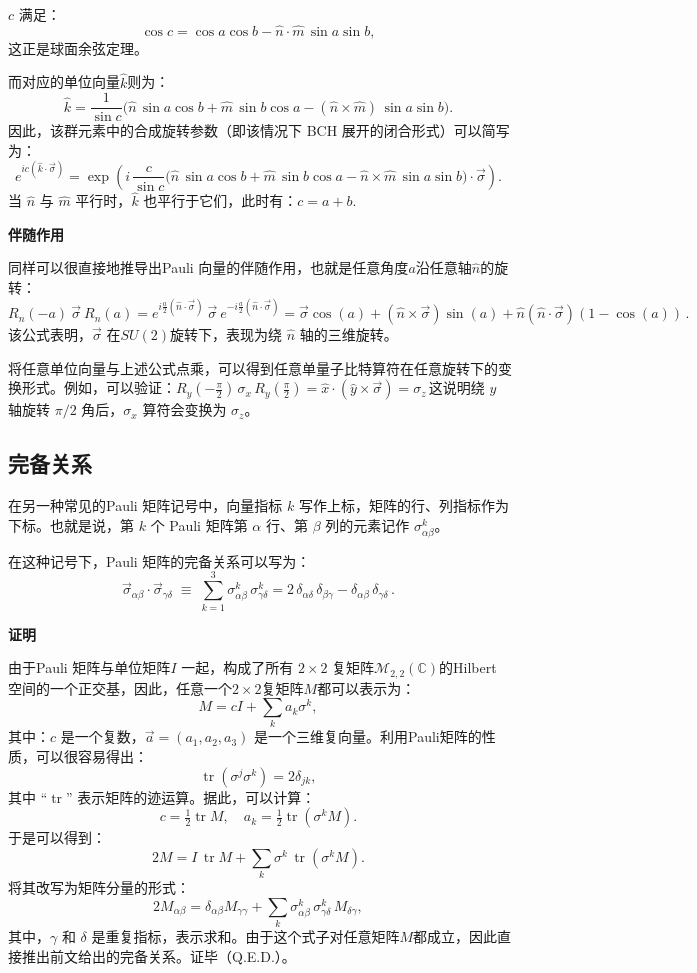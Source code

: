 $c$ 满足：
  $$
  \cos c = \cos a \cos b - \hat{n} \cdot \hat{m} \, \sin a \sin b,~
  $$
这正是球面余弦定理。

而对应的单位向量$\hat{k}$则为：
  $$
  \hat{k} = \frac{1}{\sin c} 
  \big(
  \hat{n}\,\sin a \cos b 
  + \hat{m}\,\sin b \cos a 
  - (\hat{n} \times \hat{m}) \, \sin a \sin b
  \big) .~
  $$
因此，该群元素中的合成旋转参数（即该情况下 BCH 展开的闭合形式）可以简写为：
$$
e^{ic(\hat{k}\cdot\vec{\sigma})} 
= 
\exp \!\left(
  i \, \frac{c}{\sin c} 
  \big(
  \hat{n}\,\sin a \cos b 
  + \hat{m}\,\sin b \cos a 
  - \hat{n}\times\hat{m} \, \sin a \sin b
  \big) 
  \cdot \vec{\sigma}
\right).~
$$
当 $\hat{n}$ 与 $\hat{m}$ 平行时，$\hat{k}$ 也平行于它们，此时有：$c = a + b$.

\textbf{伴随作用}

同样可以很直接地推导出Pauli 向量的伴随作用，也就是任意角度$a$沿任意轴$\hat{n}$的旋转：
$$
R_n(-a)~\vec{\sigma}~R_n(a)
= e^{i\frac{a}{2}(\hat{n}\cdot\vec{\sigma})}~\vec{\sigma}~e^{-i\frac{a}{2}(\hat{n}\cdot\vec{\sigma})}
= \vec{\sigma}\cos(a)
+ (\hat{n} \times \vec{\sigma})\sin(a)
+ \hat{n}(\hat{n} \cdot \vec{\sigma})(1-\cos(a))\,.~
$$
该公式表明，$\vec{\sigma}$ 在$SU(2)$旋转下，表现为绕 $\hat{n}$ 轴的三维旋转。

将任意单位向量与上述公式点乘，可以得到任意单量子比特算符在任意旋转下的变换形式。例如，可以验证：$R_y\!\left(-\frac{\pi}{2}\right)\,\sigma_x\,
R_y\!\left(\frac{\pi}{2}\right)= \hat{x} \cdot (\hat{y} \times \vec{\sigma})= \sigma_z\,$这说明绕 $y$ 轴旋转 $\pi/2$ 角后，$\sigma_x$ 算符会变换为 $\sigma_z$。
\subsection{完备关系}
在另一种常见的Pauli 矩阵记号中，向量指标 $k$ 写作上标，矩阵的行、列指标作为下标。也就是说，第 $k$ 个 Pauli 矩阵第 $\alpha$ 行、第 $\beta$ 列的元素记作 $\sigma^k_{\alpha\beta}$。

在这种记号下，Pauli 矩阵的完备关系可以写为：
$$
\vec{\sigma}_{\alpha\beta} \cdot \vec{\sigma}_{\gamma\delta}
\;\equiv\;
\sum_{k=1}^{3} \sigma^k_{\alpha\beta}\,\sigma^k_{\gamma\delta}
= 2\,\delta_{\alpha\delta}\,\delta_{\beta\gamma}
- \delta_{\alpha\beta}\,\delta_{\gamma\delta}\,.~
$$

\textbf{证明}

由于Pauli 矩阵与单位矩阵$I$ 一起，构成了所有 $2 \times 2$ 复矩阵$\mathcal{M}_{2,2}(\mathbb{C})$的Hilbert 空间的一个正交基，因此，任意一个$2 \times 2$复矩阵$M$都可以表示为：
$$
M = c I + \sum_k a_k \sigma^k,~
$$
其中：$c$ 是一个复数，$\vec{a} = (a_1,a_2,a_3)$ 是一个三维复向量。利用Pauli矩阵的性质，可以很容易得出：
$$
\operatorname{tr}(\sigma^j \sigma^k) = 2\delta_{jk},~
$$
其中 “$\operatorname{tr}$” 表示矩阵的迹运算。据此，可以计算：
$$
c = \tfrac{1}{2} \operatorname{tr} M,  
\quad
a_k = \tfrac{1}{2} \operatorname{tr} (\sigma^k M).~
$$
于是可以得到：
$$
2M = I \, \operatorname{tr} M + \sum_k \sigma^k \, \operatorname{tr} (\sigma^k M).~
$$
将其改写为矩阵分量的形式：
$$
2 M_{\alpha \beta} 
= \delta_{\alpha \beta} M_{\gamma \gamma} 
+ \sum_k \sigma^k_{\alpha \beta} \, \sigma^k_{\gamma \delta} \, M_{\delta \gamma},~
$$
其中，$\gamma$ 和 $\delta$ 是重复指标，表示求和。由于这个式子对任意矩阵$M$都成立，因此直接推出前文给出的完备关系。证毕（Q.E.D.）。

